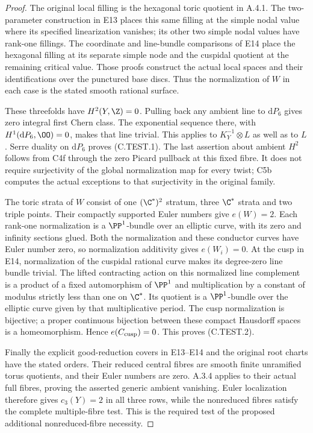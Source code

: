 \begin{proof}
The original local filling is the hexagonal toric quotient
in A.4.1. The two-parameter construction in E13 places this
same filling at the simple nodal value where its specified
linearization vanishes; its other two simple nodal values
have rank-one fillings. The coordinate and line-bundle
comparisons of E14 place the hexagonal filling at its
separate simple node and the cuspidal quotient at the
remaining critical value. Those proofs construct the actual
local spaces and their identifications over the punctured
base discs. Thus the normalization of $W$ in each case is
the stated smooth rational surface.

These threefolds have $H^2(Y,\Z)=0$. Pulling back any
ambient line to $\mathrm dP_6$ gives zero integral first
Chern class. The exponential sequence there, with
$H^1(\mathrm dP_6,\OO)=0$, makes that line trivial.
This applies to $K_Y^{-1}\otimes L$ as well as to $L$.
Serre duality on $\mathrm dP_6$ proves (C.TEST.1).
The last assertion about ambient $H^2$ follows from C4f
through the zero Picard pullback at this fixed fibre.
It does not require surjectivity of the global
normalization map for every twist; C5b computes the
actual exceptions to that surjectivity in the original
family.

The toric strata of $W$ consist of one $(\C^*)^2$ stratum,
three $\C^*$ strata and two triple points. Their compactly
supported Euler numbers give $e(W)=2$.
Each rank-one normalization is a $\PP^1$-bundle over an
elliptic curve, with its zero and infinity sections glued.
Both the normalization and these conductor curves have
Euler number zero, so normalization additivity gives
$e(W_i)=0$. At the cusp in E14, normalization of the
cuspidal rational curve makes its degree-zero line bundle
trivial. The lifted contracting action on this normalized
line complement is a product of a fixed automorphism of
$\PP^1$ and multiplication by a constant of modulus
strictly less than one on $\C^*$. Its quotient is a
$\PP^1$-bundle over the elliptic curve given by that
multiplicative period. The cusp normalization is
bijective; a proper continuous bijection between these
compact Hausdorff spaces is a homeomorphism. Hence
$e(C_{\rm cusp})=0$. This proves (C.TEST.2).

Finally the explicit good-reduction covers in E13--E14
and the original root charts have the stated orders.
Their reduced central fibres are smooth finite unramified
torus quotients, and their Euler numbers are zero.
A.3.4 applies to their actual full fibres, proving the
asserted generic ambient vanishing. Euler localization
therefore gives $c_3(Y)=2$ in all three rows, while the
nonreduced fibres satisfy the complete multiple-fibre
test. This is the required test of the proposed additional
nonreduced-fibre necessity.
\end{proof}


